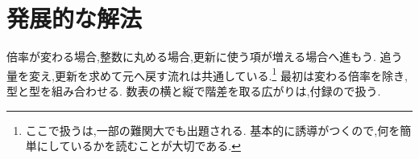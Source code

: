 
\section{発展的な解法}\label{節：発展パターン}
倍率が変わる場合,整数に丸める場合,更新に使う項が増える場合へ進もう.
追う量を変え,更新を求めて元へ戻す流れは共通している.\footnote{ここで扱うは,一部の難関大でも出題される.
基本的に誘導がつくので,何を簡単にしているかを読むことが大切である.}
最初は変わる倍率を除き,型と型を組み合わせる.
数表の横と縦で階差を取る広がりは,付録ので扱う.





